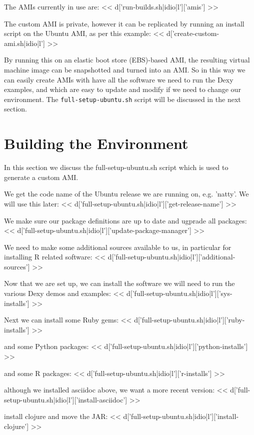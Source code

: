 \documentclass{tufte-handout}
\begin{document}
The AMIs currently in use are:
<< d['run-builds.sh|idio|l']['amis'] >>

The custom AMI is private, however it can be replicated by running an install
script on the Ubuntu AMI, as per this example: <<
d['create-custom-ami.sh|idio|l'] >>

By running this on an elastic boot store (EBS)-based AMI, the resulting virtual
machine image can be snapshotted and turned into an AMI. So in this way we can
easily create AMIs with have all the software we need to run the Dexy examples,
and which are easy to update and modify if we need to change our environment.
The \verb=full-setup-ubuntu.sh= script will be discussed in the next section.

\section{Building the Environment}

In this section we discuss the full-setup-ubuntu.sh script which is used to generate a custom AMI.

We get the code name of the Ubuntu release we are running on, e.g. 'natty'. We will use this later:
<< d['full-setup-ubuntu.sh|idio|l']['get-release-name'] >>

We make sure our package definitions are up to date and ugprade all packages:
<< d['full-setup-ubuntu.sh|idio|l']['update-package-manager'] >>

We need to make some additional sources available to us, in particular for installing R related software:
<< d['full-setup-ubuntu.sh|idio|l']['additional-sources'] >>

Now that we are set up, we can install the software we will need to run the various Dexy demos and examples:
<< d['full-setup-ubuntu.sh|idio|l']['sys-installs'] >>

Next we can install some Ruby gems:
<< d['full-setup-ubuntu.sh|idio|l']['ruby-installs'] >>

and some Python packages:
<< d['full-setup-ubuntu.sh|idio|l']['python-installs'] >>

and some R packages:
<< d['full-setup-ubuntu.sh|idio|l']['r-installs'] >>

although we installed asciidoc above, we want a more recent version:
<< d['full-setup-ubuntu.sh|idio|l']['install-asciidoc'] >>

install clojure and move the JAR:
<< d['full-setup-ubuntu.sh|idio|l']['install-clojure'] >>
\end{document}
